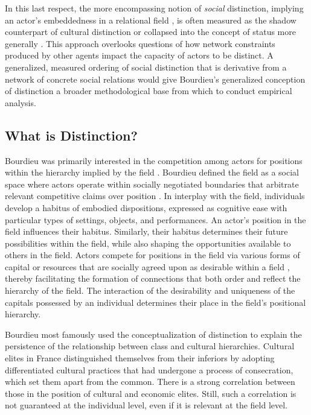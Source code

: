 \documentclass[12pt]{article}
\begin{document}
In this last respect, the more encompassing notion of \textit{social} distinction, implying an actor's embeddedness in a relational field \citep{erikson2013formalist-400, fuhse2021social-9cb}, is often measured as the shadow counterpart of cultural distinction or collapsed into the concept of status more generally \citep{podolny2010status-1a6}. This approach overlooks questions of how network constraints produced by other agents impact the capacity of actors to be distinct. A generalized, measured ordering of social distinction that is derivative from a network of concrete social relations would give Bourdieu's generalized conception of distinction a broader methodological base from which to conduct empirical analysis. 

\subsection{What is Distinction?}
Bourdieu was primarily interested in the competition among actors for positions within the hierarchy implied by the field \citep{anheier1995forms, bourdieu1993field-8ad}. Bourdieu defined the field as a social space where actors operate within socially negotiated boundaries that arbitrate relevant competitive claims over position \citep{bourdieu1996rules-393}. In interplay with the field, individuals develop a habitus of embodied dispositions, expressed as cognitive ease with particular types of settings, objects, and performances. An actor's position in the field influences their habitus. Similarly, their habitus determines their future possibilities within the field, while also shaping the opportunities available to others in the field. Actors compete for positions in the field via various forms of capital or resources that are socially agreed upon as desirable within a field \citep{martin2003field}, thereby facilitating the formation of connections that both order and reflect the hierarchy of the field. The interaction of the desirability and uniqueness of the capitals possessed by an individual determines their place in the field's positional hierarchy.   

Bourdieu \citeyearpar{bourdieu1984distinction} most famously used the conceptualization of distinction to explain the persistence of the relationship between class and cultural hierarchies. Cultural elites in France distinguished themselves from their inferiors by adopting differentiated cultural practices that had undergone a process of consecration, which set them apart from the common. There is a strong correlation between those in the position of cultural and economic elites. Still, such a correlation is not guaranteed at the individual level, even if it is relevant at the field level.   
\end{document}
